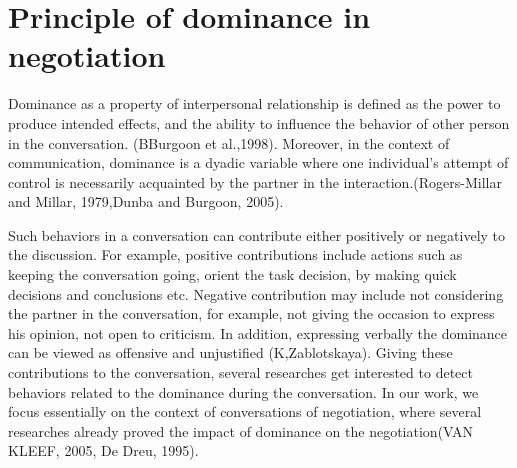\documentclass{llncs}
\begin{document}
	\title{\vskip -10pt}
	
	\author{Lydia Ould Ouali, Charles Rich \and
	Nicolas Sabouret }
	
	\maketitle 
	\begin{abstract}\vskip -20pt
	  
	\end{abstract}
	
\section{Principle of dominance in negotiation}
\par Dominance as a property of interpersonal relationship is defined as the power to produce intended effects, and the ability to influence the behavior of other person in the conversation. (BBurgoon et al.,1998).
Moreover, in the context of communication, dominance is a dyadic variable where one individual's attempt of control is necessarily acquainted by the partner in the interaction.(Rogers-Millar and Millar, 1979,Dunba and Burgoon, 2005). 

\par Such behaviors in a conversation can contribute either positively or negatively to the discussion. For example, positive contributions include actions such as keeping the conversation going, orient the task decision, by making quick decisions and conclusions etc. Negative contribution may include not considering the partner in the conversation, for example, not giving the occasion to express his opinion, not open to criticism. In addition, expressing verbally the dominance can be viewed as offensive and unjustified (K,Zablotskaya). Giving these contributions to the conversation, several researches get interested to detect  behaviors related to the dominance during the conversation. In our work, we focus essentially on the context of conversations of negotiation, where several researches already proved the impact of dominance on the negotiation(VAN KLEEF, 2005, De Dreu, 1995). 
\end{document}

